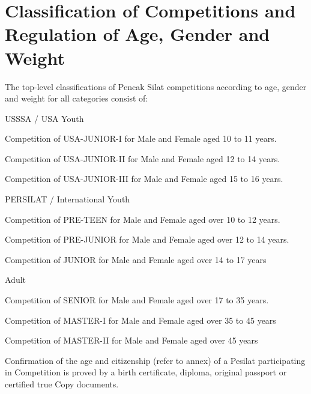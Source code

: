 \section{Classification of Competitions and Regulation of Age, Gender and Weight}


\begin{legal}
\item The top-level classifications of Pencak Silat competitions according to age, gender and weight for all categories consist of:
    \begin{legal}
    \item USSSA / USA Youth
        \begin{legal}
        \item Competition of USA-JUNIOR-I for Male and Female aged 10 to 11 years.
        \item Competition of USA-JUNIOR-II for Male and Female aged 12 to 14 years.
        \item Competition of USA-JUNIOR-III for Male and Female aged 15 to 16 years.
        \end{legal}
    \item PERSILAT / International Youth
        \begin{legal}
        \item Competition of PRE-TEEN for Male and Female aged over 10 to 12 years.
        \item Competition of PRE-JUNIOR for Male and Female aged over 12 to 14 years.
        \item Competition of JUNIOR for Male and Female aged over 14 to 17 years
        \end{legal}
    \item Adult
        \begin{legal}
        \item Competition of SENIOR for Male and Female aged over 17 to 35 years.
        \item Competition of MASTER-I for Male and Female aged over 35 to 45 years
        \item Competition of MASTER-II for Male and Female aged over 45 years
        \end{legal}
    \end{legal}

\item Confirmation of the age and citizenship (refer to annex) of a Pesilat participating in Competition is proved by a birth certificate, diploma, original passport or certified true Copy documents.


\end{legal}
